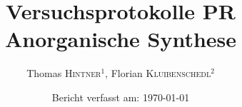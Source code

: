 \documentclass{article}
\title{Versuchsprotokolle PR Anorganische Synthese}%
\author{Thomas \textsc{Hintner}$^1$, Florian \textsc{Kluibenschedl}$^2$} %
\date{Bericht verfasst am: \today} %
\begin{document}
  
  \pagebreak
  
  \tableofcontents
  
  
  
  
  
  
  
  
  
  
  
  
  
  
  
  
  
  
  
  
  
  
  
\end{document}
